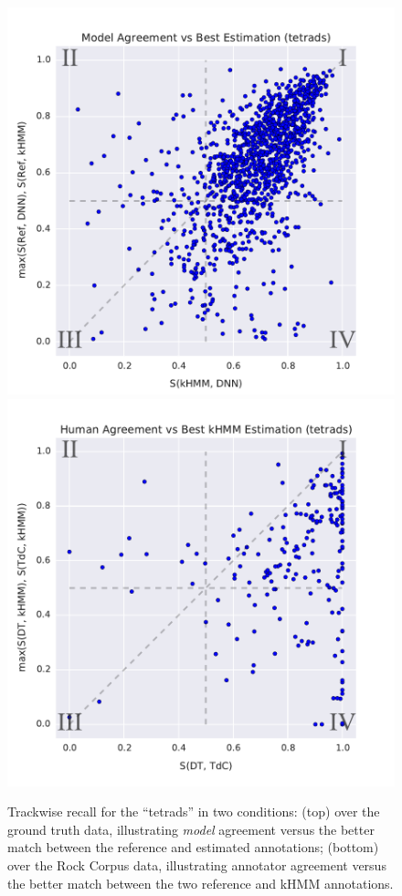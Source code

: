 \documentclass{article}
\begin{document}
\begin{figure}[!t]
\centering
\includegraphics[width=0.9\columnwidth]{model_agreement-vs-best_est}
\includegraphics[width=0.9\columnwidth]{human_agreement-vs-best_kHMM_est}
\caption{Trackwise recall for the ``tetrads'' in two conditions: (top) over the ground truth data, illustrating \emph{model} agreement versus the better match between the reference and estimated annotations; (bottom) over the Rock Corpus data, illustrating annotator agreement versus the better match between the two reference and kHMM annotations.}
\label{fig:trackwise_recall}
\end{figure}
\end{document}
